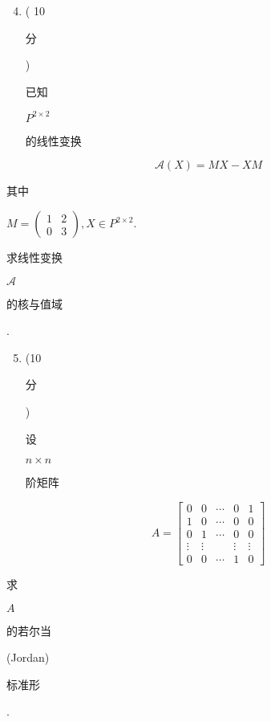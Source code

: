 \documentclass[10pt]{article}
\begin{document}
\begin{enumerate}
  \setcounter{enumi}{3}
  \item ( 10 \begin{CJK}{UTF8}{mj}分\end{CJK}) \begin{CJK}{UTF8}{mj}已知\end{CJK} $P^{2 \times 2}$ \begin{CJK}{UTF8}{mj}的线性变换\end{CJK}
\end{enumerate}
$$
\mathscr{A}(X)=M X-X M
$$
\begin{CJK}{UTF8}{mj}其中\end{CJK} $M=\left(\begin{array}{ll}1 & 2 \\ 0 & 3\end{array}\right), X \in P^{2 \times 2}$. \begin{CJK}{UTF8}{mj}求线性变换\end{CJK} $\mathscr{A}$ \begin{CJK}{UTF8}{mj}的核与值域\end{CJK}.

\begin{enumerate}
  \setcounter{enumi}{4}
  \item (10 \begin{CJK}{UTF8}{mj}分\end{CJK}) \begin{CJK}{UTF8}{mj}设\end{CJK} $n \times n$ \begin{CJK}{UTF8}{mj}阶矩阵\end{CJK}
\end{enumerate}
$$
A=\left[\begin{array}{ccccc}
0 & 0 & \cdots & 0 & 1 \\
1 & 0 & \cdots & 0 & 0 \\
0 & 1 & \cdots & 0 & 0 \\
\vdots & \vdots & & \vdots & \vdots \\
0 & 0 & \cdots & 1 & 0
\end{array}\right]
$$
\begin{CJK}{UTF8}{mj}求\end{CJK} $A$ \begin{CJK}{UTF8}{mj}的若尔当\end{CJK} (Jordan) \begin{CJK}{UTF8}{mj}标准形\end{CJK}.
\end{document}
